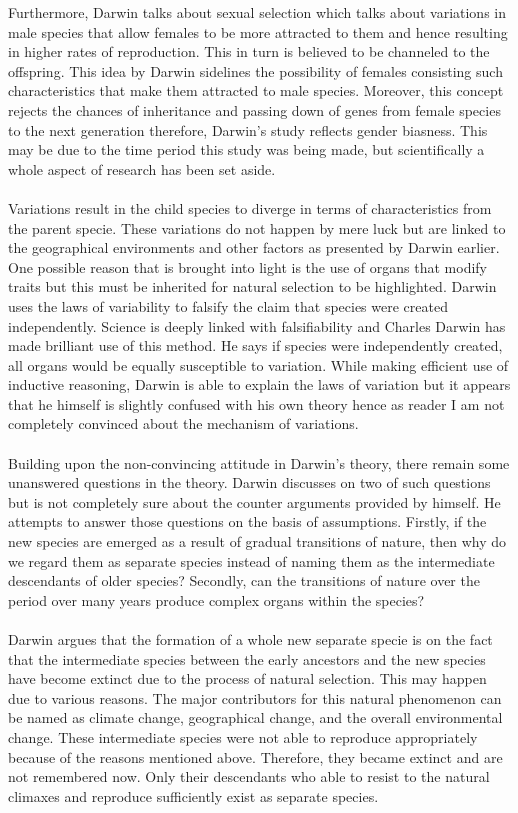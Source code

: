 \documentclass{article}
\begin{document}
	Furthermore, Darwin talks about sexual selection which talks about variations in male species that allow females to be more attracted to them and hence resulting in higher rates of reproduction. This in turn is believed to be channeled to the offspring. This idea by Darwin sidelines the possibility of females consisting such characteristics that make them attracted to male species. Moreover, this concept rejects the chances of inheritance and passing down of genes from female species to the next generation therefore, Darwin's study reflects gender biasness. This may be due to the time period this study was being made, but scientifically a whole aspect of research has been set aside. \\ \\
	Variations result in the child species to diverge in terms of characteristics from the parent specie. These variations do not happen by mere luck but are linked to the geographical environments and other factors as presented by Darwin earlier. One possible reason that is brought into light is the use of organs that modify traits but this must be inherited for natural selection to be highlighted. Darwin uses the laws of variability to falsify the claim that species were created independently. Science is deeply linked with falsifiability and Charles Darwin has made brilliant use of this method. He says if species were independently created, all organs would be equally susceptible to variation. While making efficient use of inductive reasoning, Darwin is able to explain the laws of variation but it appears that he himself is slightly confused with his own theory hence as reader I am not completely convinced about the mechanism of variations. \\ \\
	Building upon the non-convincing attitude in Darwin's theory, there remain some unanswered questions in the theory. Darwin discusses on two of such questions but is not completely sure about the counter arguments provided by himself. He attempts to answer those questions on the basis of assumptions. Firstly, if the new species are emerged as a result of gradual transitions of nature, then why do we regard them as separate species instead of naming them as the intermediate descendants of older species? Secondly, can the transitions of nature over the period over many years produce complex organs within the species? \\ \\
	Darwin argues that the formation of a whole new separate specie is on the fact that the intermediate species between the early ancestors and the new species have become extinct due to the process of natural selection. This may happen due to various reasons. The major contributors for this natural phenomenon can be named as climate change, geographical change, and the overall environmental change. These intermediate species were not able to reproduce appropriately because of the reasons mentioned above. Therefore, they became extinct and are not remembered now. Only their descendants who able to resist to the natural climaxes and reproduce sufficiently exist as separate species. \\ \\
\end{document}
